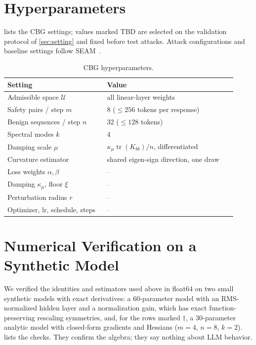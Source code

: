 \documentclass[11pt]{article}
\newcommand{\U}{\mathcal{U}}
\newcommand{\tr}{\operatorname{tr}}
\newcommand{\tbd}{\textcolor{gray}{--}}
\begin{document}
\section{Hyperparameters}
\label{app:hparams}

 lists the CBG settings; values marked TBD are selected on the validation protocol of \cref{sec:setting} and fixed before test attacks. Attack configurations and baseline settings follow SEAM~\citep{wang2026seam}.

\begin{table}[h]
\centering
\small
\caption{CBG hyperparameters.}
\label{tab:hparams}
\begin{tabular}{@{}p{0.40\linewidth}p{0.52\linewidth}@{}}
\toprule
Setting & Value\\
\midrule
Admissible space $\U$ & all linear-layer weights\\
Safety pairs / step $m$ & 8 ($\le256$ tokens per response)\\
Benign sequences / step $n$ & 32 ($\le128$ tokens)\\
Spectral modes $k$ & 4\\
Damping scale $\mu$ & $\kappa_\mu\tr(K_{bb})/n$, differentiated\\
Curvature estimator & shared eigen-sign direction, one draw\\
Loss weights $\alpha,\beta$ & \tbd\\
Damping $\kappa_\mu$, floor $\xi$ & \tbd\\
Perturbation radius $r$ & \tbd\\
Optimizer, lr, schedule, steps & \tbd\\
\bottomrule
\end{tabular}
\end{table}

\section{Numerical Verification on a Synthetic Model}
\label{app:numerical}

We verified the identities and estimators used above in float64 on two small synthetic models with exact derivatives: a 60-parameter model with an RMS-normalized hidden layer and a normalization gain, which has exact function-preserving rescaling symmetries, and, for the rows marked $\dagger$, a 30-parameter analytic model with closed-form gradients and Hessians ($m=4$, $n=8$, $k=2$).  lists the checks. They confirm the algebra; they say nothing about LLM behavior.
\end{document}
